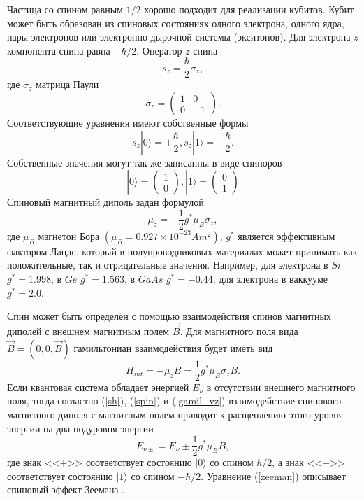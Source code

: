 \documentclass[14pt,a4paper]{PhDthesis}
\begin{document}
Частица со спином равным $1/2$ хорошо подходит для реализации кубитов. Кубит может быть образован из спиновых состояниях
одного электрона, одного ядра, пары электронов или электронно-дырочной системы (экситонов). Для электрона $z$ компонента спина равна $\pm \hbar/2$. Оператор $z$ спина 
\begin{equation}
s_{z} = \frac{\hbar}{2}\sigma_{z} \label{sh},
\end{equation}
где $\sigma_{z}$ матрица Паули
\begin{equation}
\sigma_{z} = \begin{pmatrix} 1 & 0 \\
 							 0 & -1
 			 \end{pmatrix}.
\end{equation}
Соответствующие уравнения имеют собственные формы
\begin{equation}
s_{z}|0\rangle = +\frac{\hbar}{2},   s_{z}|1\rangle = -\frac{\hbar}{2} \label{spin}.
\end{equation}
Собственные значения могут так же записанны в виде спиноров
\begin{equation}
|0\rangle = \begin{pmatrix} 1 \\
 						    0
 			 \end{pmatrix},        |1\rangle = \begin{pmatrix} 0 \\
 			    			                                   1
 			                                   \end{pmatrix}
\end{equation}
Спиновый магнитный диполь задан формулой
\begin{equation}
\mu_{z} = -\frac{1}{2}g^{*}\mu_{B}\sigma_{z},
\end{equation}
где $\mu_{B}$ магнетон Бора $(\mu_{B} = 0.927 \times 10^{-23} Am^{2})$, $g^{*}$ является эффективным фактором Ланде, который в полупроводниковых материалах может принимать как положительные, так и отрицательные значения.
Например, для электрона в $Si$ $g^{*} = 1.998$, в $Ge$ $g^{*} = 1.563$, в $GaAs$ $g^{*} = -0.44$, для электрона в ваккууме $g^{*} = 2.0$.

Спин может быть определён с помощью взаимодействия спинов магнитных диполей с внешнем магнитным полем $\vec{B}$. Для магнитного поля вида $\vec{B} = (0, 0, \vec{B})$ гамильтониан взаимодействия будет иметь вид
\begin{equation}
H_{int} = -\mu_{z}B = \frac{1}{2}g^{*}\mu_{B}\sigma_{z}B \label{gamil_vz}.
\end{equation}
Если квантовая система обладает энергией $E_{\nu}$ в отсутствии внешнего магнитного поля, тогда согластно (\ref{sh}),  (\ref{spin}) и (\ref{gamil_vz}) взаимодействие спинового магнитного диполя с магнитным полем приводит к расщеплению этого уровня энергии на два подуровня энергии
\begin{equation}
E_{\nu\pm} = E_{\nu} \pm \frac{1}{2}g^{*}\mu_{B}B \label{zeeman},
\end{equation}
где знак <<$+$>> соответствует состоянию $|0\rangle$ со спином $\hbar/2$, а знак <<$-$>> соответствует состоянию $|1\rangle$ со спином 
$-\hbar/2$. Уравнение (\ref{zeeman}) описывает спиновый эффект Зеемана \cite{Janusz:2005}. 
\end{document}
